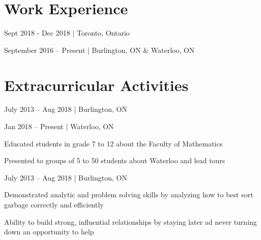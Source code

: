 \documentclass[]{formatting}
\begin{document}
\section{Work  Experience}

 { Sept 2018 - Dec 2018 | Toronto, Ontario}
\begin{tightemize}
\item 
\item 
\item 
\end{tightemize}
\sectionsep

 {September 2016 – Present | Burlington, ON  \& Waterloo, ON}
\begin{tightemize}
\item 
\item   
\end{tightemize}
\sectionsep

\begin{tightemize}
\item  
\item  
\item 
\end{tightemize}
\sectionsep



\section{Extracurricular  Activities}

 {July 2013 – Aug 2018 | Burlington, ON}
\begin{tightemize}
\item 
\item  
\end{tightemize}
\sectionsep

 {Jan 2018 – Present | Waterloo, ON}
\begin{tightemize}
\item Educated students in grade 7 to 12 about the Faculty of Mathematics 
\item Presented to groups of 5 to 50 students about Waterloo and lead tours
\end{tightemize}
\sectionsep

 {July 2013 – Aug 2018 | Burlington, ON}
\begin{tightemize}
\item Demonstrated analytic and problem solving skills by analyzing how to best sort garbage correctly and efficiently 
\item  Ability to build strong, influential relationships by staying later ad never turning down an opportunity to help
\end{tightemize}
\sectionsep
 
\end{document}

